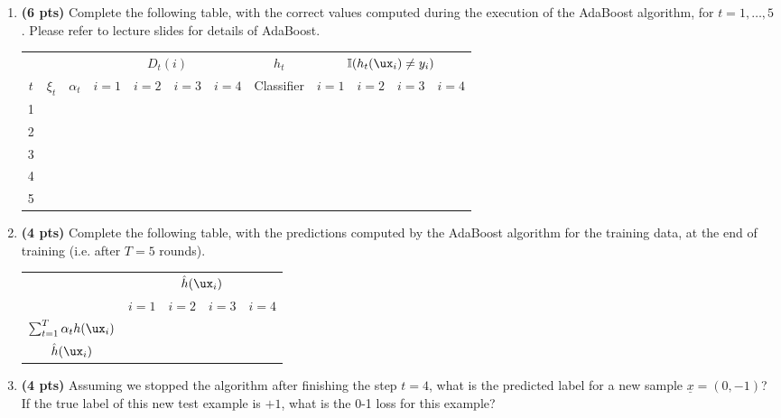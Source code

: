 \documentclass{article}
\begin{document}
\FloatBarrier
\begin{enumerate}
	\item \textbf{(6 pts)} Complete the following table, with the correct values computed during the execution of the AdaBoost algorithm, for $t=1, \dots, 5$. Please refer to lecture slides for details of AdaBoost.
\begin{table}[h!]
	\centering
	\begin{tabular}{c| cc | cccc | c | cccc}
		\toprule
			 & & & \multicolumn{4}{c|}{$D_t(i)$} & $h_t$ & \multicolumn{4}{c}{$\mathbb{I}(h_t(\ux_i) \neq y_i)$} \\
			$t$ & 
			$\xi_t$ & 
			$\alpha_t$ & 
			$i=1$ & $i=2$ & $i=3$ & $i=4$  &
			Classifier &
			$i=1$ & $i=2$ & $i=3$ & $i=4$ \\
		\midrule
		1 &  &  &&& & & &&& \\
		2 &  &  &&& & & &&& \\
		3 &  &  &&& & & &&& \\
		4 &  &  &&& & & &&& \\
		5 &  &  &&& & & &&& \\
		\bottomrule
		
	\end{tabular}
\end{table}


\FloatBarrier
\item \textbf{(4 pts)} Complete the following table, with the predictions computed by the AdaBoost algorithm for the training data, at the end of training (i.e. after $T=5$ rounds).
\begin{center}
	\begin{tabular}{ccccc}
		\toprule
		& \multicolumn{4}{c}{$\hat{h}(\ux_i)$} \\
		& $i=1$ & $i=2$ & $i=3$ & $i=4$ \\
		\midrule
		$\sum_{t=1}^T\alpha_t h(\ux_i)$&        &       &       &       \\
		$\hat{h}(\ux_i)$ &       &       &       &       \\
		\bottomrule
	\end{tabular}
\end{center}


\newpage
\item \textbf{(4 pts)} Assuming we stopped the algorithm after finishing the step $t=4$, what is the predicted label for a new sample $\underline{x} = (0, -1)$? If the true label of this new test example is $+1$, what is the 0-1 loss for this example?

\begin{tcolorbox}[breakable,
enhanced,
notitle,
width=16.1cm,
height=7cm]
%
%

\end{tcolorbox}
\end{enumerate}
\end{document}
